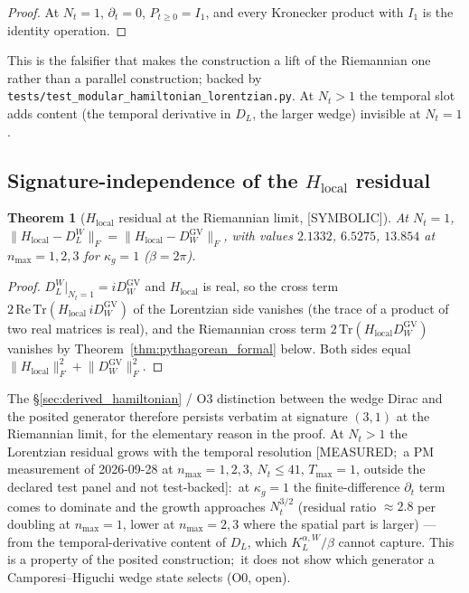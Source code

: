 \documentclass[11pt,a4paper]{article}
\theoremstyle{plain}
\newtheorem{theorem}{Theorem}[section]
\theoremstyle{definition}
\newcommand{\nmax}{n_{\max}}
\newcommand{\Frob}[1]{\lVert #1 \rVert_{F}}
\newcommand{\Tr}{\mathrm{Tr}}
\newcommand{\Nt}{N_t}
\newcommand{\DL}{D_{L}}
\newcommand{\KL}{K_{L}}
\begin{document}
\begin{proof}
At $\Nt = 1$, $\partial_t = 0$, $P_{t\ge0} = I_1$, and every Kronecker
product with $I_1$ is the identity operation.
\end{proof}

This is the falsifier that makes the construction a lift of the
Riemannian one rather than a parallel construction; backed by
\texttt{tests/test\_modular\_hamiltonian\_lorentzian.py}.  At $\Nt > 1$
the temporal slot adds content (the temporal derivative in $\DL$, the
larger wedge) invisible at $\Nt = 1$.

\subsection{Signature-independence of the $H_{\mathrm{local}}$ residual}
\label{sec:h_local_signature_independent}

\begin{theorem}[$H_{\mathrm{local}}$ residual at the Riemannian limit,
{[SYMBOLIC]}]\label{thm:h_local_sig_independent}
At $\Nt = 1$,
$\Frob{H_{\mathrm{local}} - \DL^W} = \Frob{H_{\mathrm{local}} - D_W^{\mathrm{GV}}}$,
with values $2.1332$, $6.5275$, $13.854$ at $\nmax = 1, 2, 3$ for
$\kappa_g = 1$ ($\beta = 2\pi$).
\end{theorem}

\begin{proof}
$\DL^W|_{\Nt=1} = i D_W^{\mathrm{GV}}$ and $H_{\mathrm{local}}$ is real,
so the cross term $2\,\mathrm{Re}\,\Tr(H_{\mathrm{local}}\, iD_W^{\mathrm{GV}})$
of the Lorentzian side vanishes (the trace of a product of two real
matrices is real), and the Riemannian cross term
$2\,\Tr(H_{\mathrm{local}} D_W^{\mathrm{GV}})$ vanishes by
Theorem~\ref{thm:pythagorean_formal} below.  Both sides equal
$\Frob{H_{\mathrm{local}}}^2 + \Frob{D_W^{\mathrm{GV}}}^2$.
\end{proof}

The \S\ref{sec:derived_hamiltonian} / O3 distinction between the wedge
Dirac and the posited generator therefore persists verbatim at
signature $(3, 1)$ at the Riemannian limit, for the elementary reason in
the proof.  At $\Nt > 1$ the Lorentzian residual grows with the temporal
resolution [MEASURED;\ a PM measurement of 2026-09-28 at
$\nmax = 1, 2, 3$, $\Nt \le 41$, $T_{\max} = 1$, outside the declared test
panel and not test-backed]:\ at $\kappa_g = 1$ the finite-difference
$\partial_t$ term comes to dominate and the growth approaches $\Nt^{3/2}$
(residual ratio $\approx 2.8$ per doubling at $\nmax = 1$, lower at
$\nmax = 2, 3$ where the spatial part is larger) --- from the temporal-derivative content of $\DL$, which
$\KL^{\alpha, W}/\beta$ cannot capture.  This is a property of the posited
construction;\ it does not show which generator a Camporesi--Higuchi
wedge state selects (O0, open).
\end{document}
